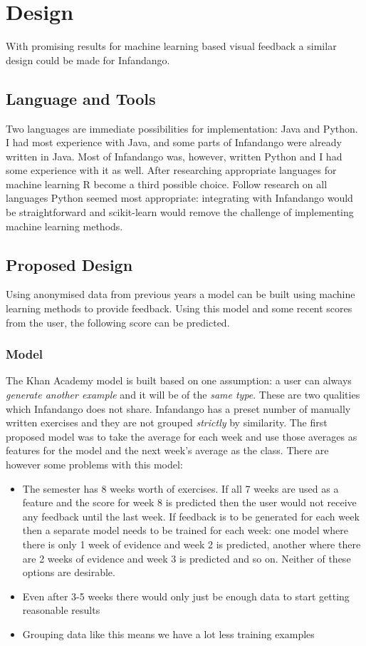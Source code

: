 \chapter{Design}
\label{design}
With promising results for machine learning based visual feedback a similar design could be made for Infandango.
\section{Language and Tools}
Two languages are immediate possibilities for implementation: Java\cite{java_site} and Python\cite{python_site}. I had most experience with Java, and some parts of Infandango were already written in Java. Most of Infandango was, however, written Python and I had some experience with it as well. After researching appropriate languages for machine learning R\cite{r_site} become a third possible choice. Follow research on all languages Python seemed most appropriate: integrating with Infandango would be straightforward and scikit-learn\cite{scikit_site} would remove the challenge of implementing machine learning methods.
\section{Proposed Design}
Using anonymised data from previous years a model can be built using machine learning methods to provide feedback. Using this model and some recent scores from the user, the following score can be predicted. 
\subsection{Model}
The Khan Academy model is built based on one assumption: a user can always \emph{generate another example} and it will be of the \emph{same type}. These are two qualities which Infandango does not share. Infandango has a preset number of manually written exercises and they are not grouped \emph{strictly} by similarity. The first proposed model was to take the average for each week and use those averages as features for the model and the next week's average as the class. There are however some problems with this model:

\begin{itemize}
\item The semester has 8 weeks worth of exercises. If all 7 weeks are used as a feature and the score for week 8 is predicted then the user would not receive any feedback until the last week. If feedback is to be generated for each week then a separate model needs to be trained for each week: one model where there is only 1 week of evidence and week 2 is predicted, another where there are 2 weeks of evidence and week 3 is predicted and so on. Neither of these options are desirable.
\item Even after 3-5 weeks there would only just be enough data to start getting reasonable results  %
\item Grouping data like this means we have a lot less training examples
\end{itemize}

